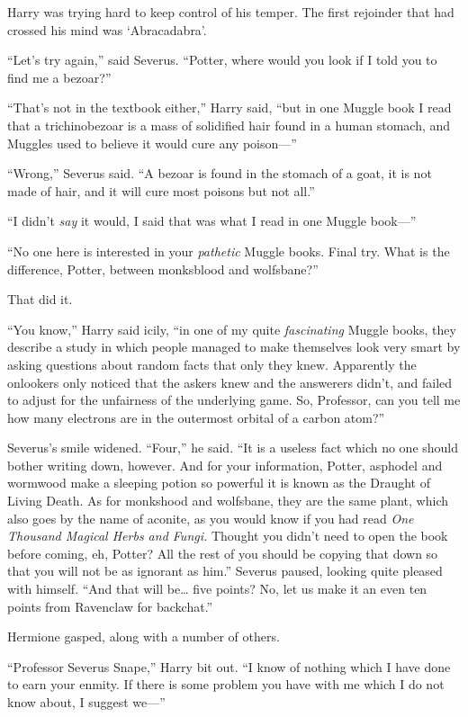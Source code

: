 Harry was trying hard to keep control of his temper. The first rejoinder
that had crossed his mind was `Abracadabra'.

``Let's try again,'' said Severus. ``Potter, where would you look if I
told you to find me a bezoar?''

``That's not in the textbook either,'' Harry said, ``but in one Muggle
book I read that a trichinobezoar is a mass of solidified hair found in
a human stomach, and Muggles used to believe it would cure any
poison---''

``Wrong,'' Severus said. ``A bezoar is found in the stomach of a goat,
it is not made of hair, and it will cure most poisons but not all.''

``I didn't \emph{say} it would, I said that was what I read in one
Muggle book---''

``No one here is interested in your \emph{pathetic} Muggle books. Final
try. What is the difference, Potter, between monksblood and wolfsbane?''

That did it.

``You know,'' Harry said icily, ``in one of my quite \emph{fascinating}
Muggle books, they describe a study in which people managed to make
themselves look very smart by asking questions about random facts that
only they knew. Apparently the onlookers only noticed that the askers
knew and the answerers didn't, and failed to adjust for the unfairness
of the underlying game. So, Professor, can you tell me how many
electrons are in the outermost orbital of a carbon atom?''

Severus's smile widened. ``Four,'' he said. ``It is a useless fact which
no one should bother writing down, however. And for your information,
Potter, asphodel and wormwood make a sleeping potion so powerful it is
known as the Draught of Living Death. As for monkshood and wolfsbane,
they are the same plant, which also goes by the name of aconite, as you
would know if you had read \emph{One Thousand Magical Herbs and Fungi.}
Thought you didn't need to open the book before coming, eh, Potter? All
the rest of you should be copying that down so that you will not be as
ignorant as him.'' Severus paused, looking quite pleased with himself.
``And that will be\ldots{} five points? No, let us make it an even ten
points from Ravenclaw for backchat.''

Hermione gasped, along with a number of others.

``Professor Severus Snape,'' Harry bit out. ``I know of nothing which I
have done to earn your enmity. If there is some problem you have with me
which I do not know about, I suggest we---''

